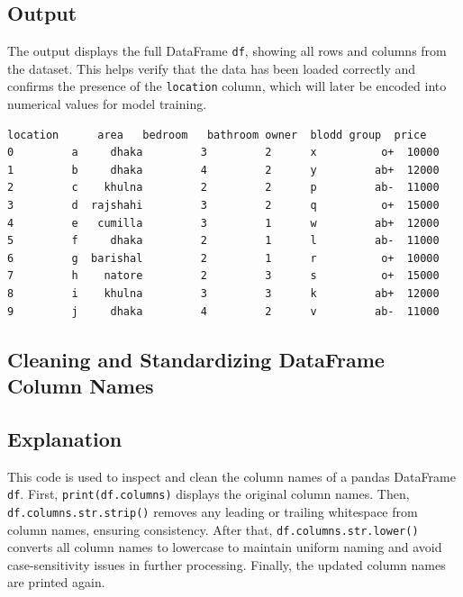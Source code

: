 \documentclass[11pt,a4paper]{report}
\makeatletter
\newcommand{\boxspacing}{\kern\kvtcb@left@rule\kern\kvtcb@boxsep}
\newcommand{\prompt}[4]{
        {\ttfamily\llap{{\color{#2}[#3]:\hspace{3pt}#4}}\vspace{-\baselineskip}}
    }
\makeatother
\begin{document}
\subsection*{Output}
The output displays the full DataFrame \texttt{df}, showing all rows and columns from the dataset. This helps verify that the data has been loaded correctly and confirms the presence of the \texttt{location} column, which will later be encoded into numerical values for model training.
            \begin{tcolorbox}[breakable, size=fbox, boxrule=.5pt, pad at break*=1mm, opacityfill=0]
\prompt{Out}{outcolor}{96}{\boxspacing}
\begin{Verbatim}[commandchars=\\\{\}]
  location      area   bedroom   bathroom owner  blodd group  price
0         a     dhaka         3         2      x          o+  10000
1         b     dhaka         4         2      y         ab+  12000
2         c    khulna         2         2      p         ab-  11000
3         d  rajshahi         3         2      q          o+  15000
4         e   cumilla         3         1      w         ab+  12000
5         f     dhaka         2         1      l         ab-  11000
6         g  barishal         2         1      r          o+  10000
7         h    natore         2         3      s          o+  15000
8         i    khulna         3         3      k         ab+  12000
9         j     dhaka         4         2      v         ab-  11000
\end{Verbatim}
\end{tcolorbox}
 
 
 
\subsection{Cleaning and Standardizing DataFrame Column Names}
\subsection*{Explanation}
This code is used to inspect and clean the column names of a pandas DataFrame \texttt{df}. First, \texttt{print(df.columns)} displays the original column names. Then, \texttt{df.columns.str.strip()} removes any leading or trailing whitespace from column names, ensuring consistency. After that, \texttt{df.columns.str.lower()} converts all column names to lowercase to maintain uniform naming and avoid case-sensitivity issues in further processing. Finally, the updated column names are printed again.
\end{document}
